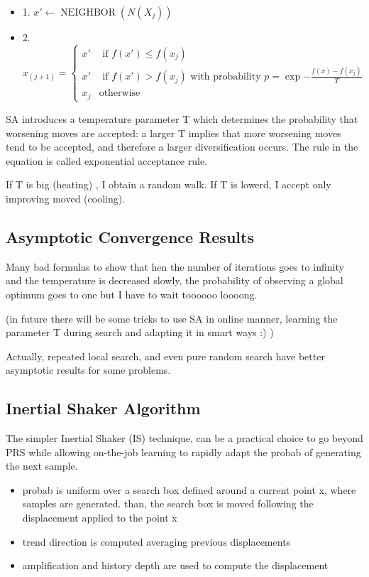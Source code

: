 \documentclass[10pt]{article}
\DeclareMathOperator{\neighbor}{NEIGHBOR}
\begin{document}
\begin{itemize}
\item{1. $x' \leftarrow \neighbor(N(X_j))$}
\item{2. $x_{(j+1)} = \begin{cases} 
      x' & \text{ if } f(x') \leq f(x_j) \\
      x' & \text{ if } f(x') > f(x_j) \text{ with probability } p = \exp{-\frac{f(x)-f(x_j)}{T}} \\
      x_j & \text{otherwise}
   \end{cases}
$}
\end{itemize}

SA introduces a temperature parameter T which determines the probability that worsening moves are accepted:
a larger T implies that more worsening moves tend to be accepted, and therefore a larger diversification occurs. The rule in the equation is called exponential acceptance rule.

If T is big (heating) , I obtain a random walk. If T is lowerd, I accept only improving moved (cooling).

\subsection{Asymptotic Convergence Results}

Many bad formulas to show that hen the number of iterations goes to infinity and the temperature is decreased slowly, the probability of
observing a global optimum goes to one but I have to wait toooooo loooong.

(in future there will be some tricks to use SA in online manner, learning the parameter T during search and adapting it in smart ways :) )

Actually, repeated local search, and even pure random search have better asymptotic results
for some problems.

\subsection{Inertial Shaker Algorithm}
The simpler Inertial Shaker (IS) technique, can be a practical choice to go beyond PRS while allowing on-the-job learning to rapidly adapt the probab of generating the next sample.

\begin{itemize}
\item probab is uniform over a search box defined around a current point x, where samples are generated. than, the search box is moved following the displacement applied to the point x
\item trend direction is computed averaging previous displacements
\item amplification and history depth are used to compute the displacement
\end{itemize}
\end{document}
